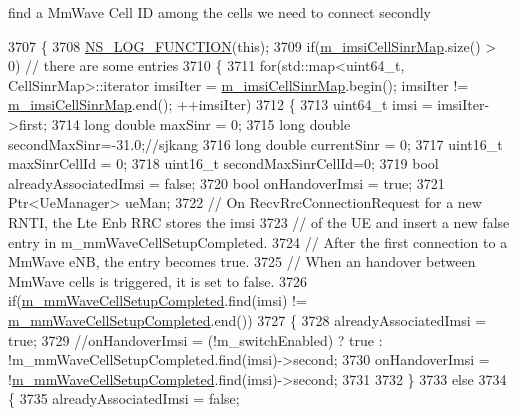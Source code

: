 find a Mm\+Wave Cell ID among the cells we need to connect secondly 
\begin{DoxyCode}
3707 \{
3708         \hyperlink{log-macros-disabled_8h_a90b90d5bad1f39cb1b64923ea94c0761}{NS\_LOG\_FUNCTION}(\textcolor{keyword}{this});
3709   \textcolor{keywordflow}{if}(\hyperlink{classns3_1_1LteEnbRrc_a72b3ce5c1f8495e96bfc0f384ecf3a96}{m\_imsiCellSinrMap}.size() > 0) \textcolor{comment}{// there are some entries}
3710   \{
3711     \textcolor{keywordflow}{for}(std::map<uint64\_t, CellSinrMap>::iterator imsiIter = \hyperlink{classns3_1_1LteEnbRrc_a72b3ce5c1f8495e96bfc0f384ecf3a96}{m\_imsiCellSinrMap}.begin(); 
      imsiIter != \hyperlink{classns3_1_1LteEnbRrc_a72b3ce5c1f8495e96bfc0f384ecf3a96}{m\_imsiCellSinrMap}.end(); ++imsiIter)
3712     \{
3713       uint64\_t imsi = imsiIter->first;
3714       \textcolor{keywordtype}{long} \textcolor{keywordtype}{double} maxSinr = 0;
3715       \textcolor{keywordtype}{long} \textcolor{keywordtype}{double} secondMaxSinr=-31.0;\textcolor{comment}{//sjkang}
3716       \textcolor{keywordtype}{long} \textcolor{keywordtype}{double} currentSinr = 0;
3717       uint16\_t maxSinrCellId = 0;
3718       uint16\_t secondMaxSinrCellId=0;
3719       \textcolor{keywordtype}{bool} alreadyAssociatedImsi = \textcolor{keyword}{false};
3720       \textcolor{keywordtype}{bool} onHandoverImsi = \textcolor{keyword}{true};
3721       Ptr<UeManager> ueMan;
3722       \textcolor{comment}{// On RecvRrcConnectionRequest for a new RNTI, the Lte Enb RRC stores the imsi}
3723       \textcolor{comment}{// of the UE and insert a new false entry in m\_mmWaveCellSetupCompleted.}
3724       \textcolor{comment}{// After the first connection to a MmWave eNB, the entry becomes true.}
3725       \textcolor{comment}{// When an handover between MmWave cells is triggered, it is set to false.}
3726       \textcolor{keywordflow}{if}(\hyperlink{classns3_1_1LteEnbRrc_ad19d6f4c123115e1d13e34609781ab20}{m\_mmWaveCellSetupCompleted}.find(imsi) != 
      \hyperlink{classns3_1_1LteEnbRrc_ad19d6f4c123115e1d13e34609781ab20}{m\_mmWaveCellSetupCompleted}.end())
3727       \{
3728         alreadyAssociatedImsi = \textcolor{keyword}{true};
3729         \textcolor{comment}{//onHandoverImsi = (!m\_switchEnabled) ? true : !m\_mmWaveCellSetupCompleted.find(imsi)->second;}
3730         onHandoverImsi = !\hyperlink{classns3_1_1LteEnbRrc_ad19d6f4c123115e1d13e34609781ab20}{m\_mmWaveCellSetupCompleted}.find(imsi)->second;
3731 
3732       \}
3733       \textcolor{keywordflow}{else}
3734       \{
3735         alreadyAssociatedImsi = \textcolor{keyword}{false};

\end{DoxyCode}
